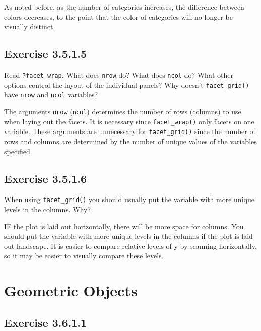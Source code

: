 \documentclass[]{book}
\theoremstyle{plain}
\theoremstyle{remark}
\begin{document}
As noted before, as the number of categories increases, the difference
between colors decreases, to the point that the color of categories will
no longer be visually distinct.

\hypertarget{exercise-3.5.1.5}{%
\subsection*{\texorpdfstring{Exercise
{3.5.1.5}}{Exercise 3.5.1.5}}\label{exercise-3.5.1.5}}

Read \texttt{?facet\_wrap}. What does \texttt{nrow} do? What does
\texttt{ncol} do? What other options control the layout of the
individual panels? Why doesn't \texttt{facet\_grid()} have \texttt{nrow}
and \texttt{ncol} variables?

The arguments \texttt{nrow} (\texttt{ncol}) determines the number of
rows (columns) to use when laying out the facets. It is necessary since
\texttt{facet\_wrap()} only facets on one variable. These arguments are
unnecessary for \texttt{facet\_grid()} since the number of rows and
columns are determined by the number of unique values of the variables
specified.

\hypertarget{exercise-3.5.1.6}{%
\subsection*{\texorpdfstring{Exercise
{3.5.1.6}}{Exercise 3.5.1.6}}\label{exercise-3.5.1.6}}

When using \texttt{facet\_grid()} you should usually put the variable
with more unique levels in the columns. Why?

IF the plot is laid out horizontally, there will be more space for
columns. You should put the variable with more unique levels in the
columns if the plot is laid out landscape. It is easier to compare
relative levels of y by scanning horizontally, so it may be easier to
visually compare these levels.

\hypertarget{geometric-objects}{%
\section{Geometric Objects}\label{geometric-objects}}

\hypertarget{exercise-3.6.1.1}{%
\subsection*{\texorpdfstring{Exercise
{3.6.1.1}}{Exercise 3.6.1.1}}\label{exercise-3.6.1.1}}
\end{document}
